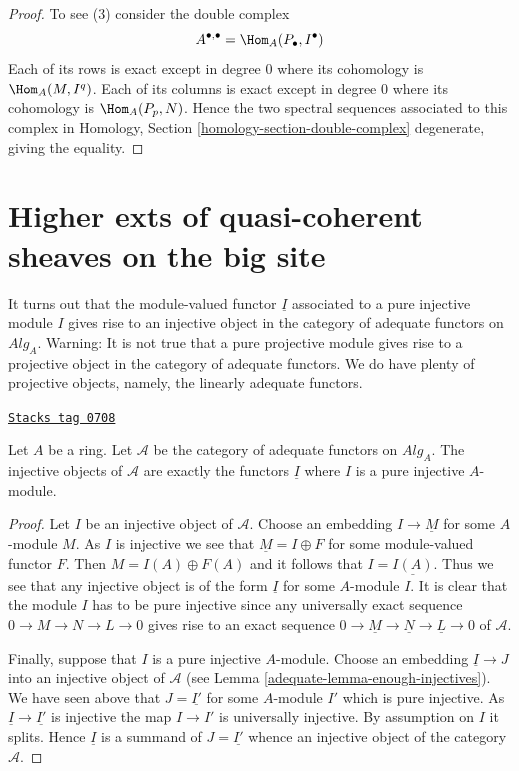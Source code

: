 \begin{proof}
To see (3) consider the double complex
$$
A^{\bullet, \bullet} = \Hom_A(P_\bullet, I^\bullet)
$$
Each of its rows is exact except in degree $0$ where its cohomology
is $\Hom_A(M, I^q)$. Each of its columns is exact except in degree $0$
where its cohomology is $\Hom_A(P_p, N)$. Hence the two spectral
sequences associated to this complex in
Homology, Section \ref{homology-section-double-complex}
degenerate, giving the equality.
\end{proof}

\section{Higher exts of quasi-coherent sheaves on the big site}
\label{adequate-section-big}
It turns out that the module-valued functor $\underline{I}$ associated to
a pure injective module $I$ gives rise to an injective object in the
category of adequate functors on $\textit{Alg}_A$.
Warning: It is not true that a pure projective module gives rise to
a projective object in the category of adequate functors. We do have
plenty of projective objects, namely, the linearly adequate functors.

\begin{lemma}
\label{adequate-lemma-pure-injective-injective-adequate}
\href{https://stacks.math.columbia.edu/tag/0708}{\texttt{Stacks tag 0708}}

Let $A$ be a ring.
Let $\mathcal{A}$ be the category of adequate functors on $\textit{Alg}_A$.
The injective objects of $\mathcal{A}$ are exactly the functors
$\underline{I}$ where $I$ is a pure injective $A$-module.
\end{lemma}

\begin{proof}

Let $I$ be an injective object of $\mathcal{A}$.
Choose an embedding $I \to \underline{M}$ for some $A$-module $M$.
As $I$ is injective we see that $\underline{M} = I \oplus F$ for some
module-valued functor $F$. Then $M = I(A) \oplus F(A)$ and it follows
that $I = \underline{I(A)}$. Thus we see that any injective object
is of the form $\underline{I}$ for some $A$-module $I$.
It is clear that the module $I$ has to be pure injective
since any universally exact sequence $0 \to M \to N \to L \to 0$
gives rise to an exact sequence
$0 \to \underline{M} \to \underline{N} \to \underline{L} \to 0$
of $\mathcal{A}$.

\medskip\noindent
Finally, suppose that $I$ is a pure injective
$A$-module. Choose an embedding $\underline{I} \to J$
into an injective object of $\mathcal{A}$ (see
Lemma \ref{adequate-lemma-enough-injectives}).
We have seen above that $J = \underline{I'}$
for some $A$-module $I'$ which is pure injective. As
$\underline{I} \to \underline{I'}$ is injective
the map $I \to I'$ is universally injective. By assumption on $I$
it splits. Hence $\underline{I}$ is a summand of $J = \underline{I'}$
whence an injective object of the category $\mathcal{A}$.
\end{proof}

